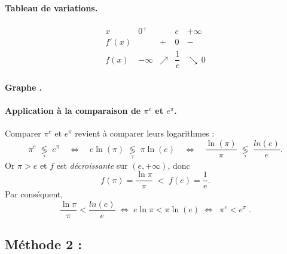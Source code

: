 \paragraph{Tableau de variations.}
\[
\begin{array}{c|ccc|c}
x & 0^+ & & e & +\infty \\ \hline
f'(x) &  & + & 0 & - \\
\hline
f(x) & -\infty & \nearrow & \dfrac{1}{e} & \searrow\, 0
\end{array}
\]

\paragraph{Graphe .}
\begin{center}
\end{center}

\paragraph{Application à la comparaison de $\pi^{e}$ et $e^{\pi}$.}
Comparer $\pi^{e}$ et $e^{\pi}$ revient à comparer leurs logarithmes :
\[
\pi^{e} \;\underset{?}{\lessgtr}\; e^{\pi}
\quad\Longleftrightarrow\quad
e\ln(\pi) \;\underset{?}{\lessgtr}\; \pi \ln(e)
\quad\Longleftrightarrow\quad
\frac{\ln(\pi)}{\pi} \;\underset{?}{\lessgtr}\; \frac{ln(e)}{e}.
\]
Or $\pi>e$ et $f$ est \emph{décroissante} sur $(e,+\infty)$, donc
\[
f(\pi)=\frac{\ln\pi}{\pi} \;<\; f(e)=\frac{1}{e}.
\]
Par conséquent,
\[
\frac{\ln\pi}{\pi} < \frac{ln(e)}{e}
\;\Longleftrightarrow\;
e\ln\pi < \pi \ln(e)
\;\Longleftrightarrow\;
\boxed{\;\pi^{e} < e^{\pi}\; }.
\]

\subsection*{Méthode 2 :}


